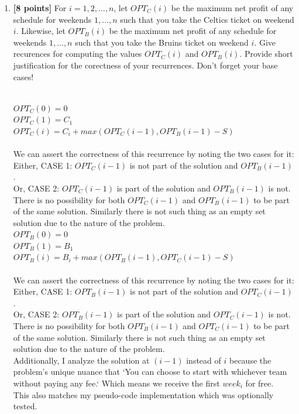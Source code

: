 \documentclass[11pt]{article}
\theoremstyle{definition}
\theoremstyle{theorem}
\newcommand{\solution}{\medskip\noindent{\color{DarkBlue}\textbf{Solution:}}}
\begin{document}
\begin{enumerate}[label=(\alph*)]

\item \textbf{[8 points]} For $i=1,2,\dots,n$, let $OPT_C(i)$ be the maximum net profit of any schedule for weekends $1,\dots,n$ such that you take the Celtics ticket on weekend $i$. Likewise, let $OPT_B(i)$ be the maximum net profit of any schedule for weekends $1,\dots,n$ such that you take the Bruins ticket on weekend $i$. Give recurences for computing the values $OPT_C(i)$ and $OPT_B(i)$. Provide short justification for the corectness of your recurrences. Don't forget your base cases!

\solution \\ 

$OPT_C(0) = 0$ \\
$OPT_C(1) = C_1$ \\
$OPT_C(i) = C_i + max(OPT_C(i-1), OPT_B(i-1) - S)$ \\\\
We can assert the correctness of this recurrence by noting the two cases for it:\\
Either, CASE 1: $OPT_C(i-1)$ is not part of the solution and $OPT_B(i-1)$.\\
Or, CASE 2: $OPT_C(i-1)$ is part of the solution and $OPT_B(i-1)$ is not. \\
There is no possibility for both $OPT_C(i-1)$ and $OPT_B(i-1)$ to be part of the same solution. Similarly there is not such thing as an empty set solution due to the nature of the problem.\\

$OPT_B(0) = 0$ \\
$OPT_B(1) = B_1$ \\
$OPT_B(i) = B_i + max(OPT_B(i-1),OPT_C(i-1) - S)$ \\\\
We can assert the correctness of this recurrence by noting the two cases for it:\\
Either, CASE 1: $OPT_B(i-1)$ is not part of the solution and $OPT_C(i-1)$.\\
Or, CASE 2: $OPT_B(i-1)$ is part of the solution and $OPT_C(i-1)$ is not. \\
There is no possibility for both $OPT_B(i-1)$ and $OPT_C(i-1)$ to be part of the same solution. Similarly there is not such thing as an empty set solution due to the nature of the problem. \\

Additionally, I analyze the solution at $(i-1)$ instead of $i$ because the problem's unique nuance that `You can choose to start with whichever team without paying any fee.` Which means we receive the first $week_i$ for free.\\ This also matches my pseudo-code implementation which was optionally tested.\\


\end{enumerate}
\end{document}
